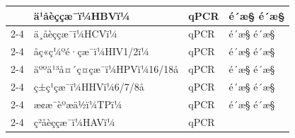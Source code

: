 \documentclass[UTF8,10pt,a4paper,fontset=fandol]{ctexart}
\newcommand{\fieldvalue}[1]{#1}
\begin{document}
\begin{tabularx}{\textwidth}{|p{2.2cm}|X|p{2.0cm}|X|}
&
\fieldvalue{ä¹åèççæ¯ï¼HBVï¼}
&
\fieldvalue{qPCR}
&
\fieldvalue{é´æ§}
\quad
\fieldvalue{é´æ§}
\\ \cline{2-4}
&
\fieldvalue{ä¸åèççæ¯ï¼HCVï¼}
&
\fieldvalue{qPCR}
&
\fieldvalue{é´æ§}
\quad
\fieldvalue{é´æ§}
\\ \cline{2-4}
&
\fieldvalue{åç«ç¼ºé·çæ¯ï¼HIV1/2ï¼}
&
\fieldvalue{qPCR}
&
\fieldvalue{é´æ§}
\quad
\fieldvalue{é´æ§}
\\ \cline{2-4}
&
\fieldvalue{äººä¹³å¤´ç¤çæ¯ï¼HPVï¼16/18å}
&
\fieldvalue{qPCR}
&
\fieldvalue{é´æ§}
\quad
\fieldvalue{é´æ§}
\\ \cline{2-4}
&
\fieldvalue{ç±ç¹çæ¯ï¼HHVï¼6/7/8å}
&
\fieldvalue{qPCR}
&
\fieldvalue{é´æ§}
\quad
\fieldvalue{é´æ§}
\\ \cline{2-4}
&
\fieldvalue{æ¢æ¯èºæä½ï¼TPï¼}
&
\fieldvalue{qPCR}
&
\fieldvalue{é´æ§}
\quad
\fieldvalue{é´æ§}
\\ \cline{2-4}
&
\fieldvalue{ç²åèççæ¯ï¼HAVï¼}
&
\fieldvalue{qPCR}
&

\end{tabularx}
\end{document}
